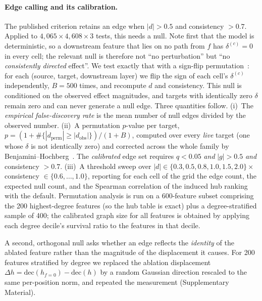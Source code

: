 \documentclass[11pt,onecolumn]{article}
\begin{document}
\paragraph{Edge calling and its calibration.}
\label{sec:calibration}
The published criterion retains an edge when $|d|>0.5$ and consistency $>0.7$. Applied to $4{,}065\times 4{,}608\times 3$ tests, this needs a null. Note first that the model is deterministic, so a downstream feature that lies on no path from $f$ has $\delta^{(c)}=0$ in every cell; the relevant null is therefore not ``no perturbation'' but ``no \emph{consistently directed} effect''. We test exactly that with a sign-flip permutation~\citep{good2000permutation}: for each (source, target, downstream layer) we flip the sign of each cell's $\delta^{(c)}$ independently, $B=500$ times, and recompute $d$ and consistency. This null is conditioned on the observed effect magnitudes, and targets with identically zero $\delta$ remain zero and can never generate a null edge. Three quantities follow. (i)~The \emph{empirical false-discovery rate} is the mean number of null edges divided by the observed number. (ii)~A permutation $p$-value per target, $p = (1 + \#\{|d_{\text{perm}}| \geq |d_{\text{obs}}|\})/(1+B)$, computed over every \emph{live} target (one whose $\delta$ is not identically zero) and corrected across the whole family by Benjamini--Hochberg~\citep{benjamini1995controlling}. The \emph{calibrated} edge set requires $q<0.05$ \emph{and} $|g|>0.5$ \emph{and} consistency $>0.7$. (iii)~A threshold sweep over $|d|\in\{0.3,0.5,0.8,1.0,1.5,2.0\}\times$ consistency $\in\{0.6,\dots,1.0\}$, reporting for each cell of the grid the edge count, the expected null count, and the Spearman correlation of the induced hub ranking with the default. Permutation analysis is run on a 600-feature subset comprising the 200 highest-degree features (so the hub table is exact) plus a degree-stratified sample of 400; the calibrated graph size for all features is obtained by applying each degree decile's survival ratio to the features in that decile.

A second, orthogonal null asks whether an edge reflects the \emph{identity} of the ablated feature rather than the magnitude of the displacement it causes. For 200 features stratified by degree we replaced the ablation displacement $\Delta h = \mathrm{dec}(h_{f=0}) - \mathrm{dec}(h)$ by a random Gaussian direction rescaled to the same per-position norm, and repeated the measurement (Supplementary Material).
\end{document}
